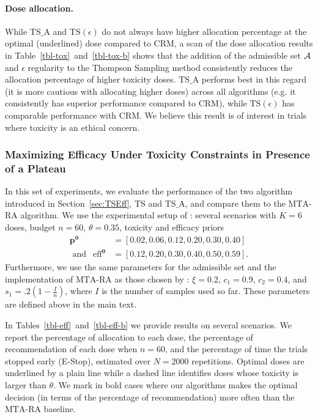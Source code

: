 \paragraph{Dose allocation.} While $\mathrm{TS}\_\mathrm{A}$ and $\mathrm{TS}(\epsilon)$ do not always have higher allocation percentage at the optimal (underlined) dose compared to CRM, a scan of the dose allocation results in Table~\ref{tbl-tox}~and~\ref{tbl-tox-b} shows that the addition of the admissible set $\mathcal{A}$ and $\epsilon$ regularity to the Thompson Sampling method consistently reduces the allocation percentage of higher toxicity doses. $\mathrm{TS}\_\mathrm{A}$ performs best in this regard (it is more cautious with allocating higher doses) across all algorithms (e.g. it consistently has superior performance compared to CRM), while $\mathrm{TS}(\epsilon)$ has comparable performance with CRM. We believe this result is of interest in trials where toxicity is an ethical concern.



\clearpage

\subsubsection{Maximizing Efficacy Under Toxicity Constraints in Presence of a Plateau} \label{subsec:toxOnlyExp}

In this set of experiments, we evaluate the performance of the two algorithm introduced in Section~\ref{sec:TSEff}, $\mathrm{TS}$ and $\mathrm{TS}\_\mathrm{A}$, and compare them to the $\mathrm{MTA}$-$\mathrm{RA}$ algorithm. We use the experimental setup of \cite{MKR17}: several scenarios with $K=6$ doses, budget $n=60$, $\theta = 0.35$, toxicity and efficacy priors
\begin{align*}
\bm{p^0} &= [0.02, 0.06, 0.12, 0.20, 0.30, 0.40]
\\
\text{ and } \ \ \bm{\mathrm{eff}^0} &= [0.12, 0.20, 0.30, 0.40, 0.50, 0.59].
\end{align*}
Furthermore, we use the same parameters for the admissible set and the implementation of $\mathrm{MTA}$-$\mathrm{RA}$ as those chosen by \cite{MKR17}: $\xi=0.2$, $c_1=0.9$, $c_2=0.4$, and $s_1=.2\left(1-\frac{I}{n}\right)$, where $I$ is the number of samples used so far. These parameters are defined above in the main text.
 




In Tables~\ref{tbl-eff}~and~\ref{tbl-eff-b} we provide results on several scenarios. We report the percentage of allocation to each dose, the percentage of recommendation of each dose when $n=60$, and the percentage of time the trials stopped early (E-Stop), estimated over $N=2000$ repetitions.
Optimal doses are underlined by a plain line while a dashed line identifies doses whose toxicity is larger than $\theta$. We mark in bold cases where
our algorithms makes the optimal decision (in terms of the percentage of recommendation) more often than the
$\mathrm{MTA}$-$\mathrm{RA}$ baseline.

